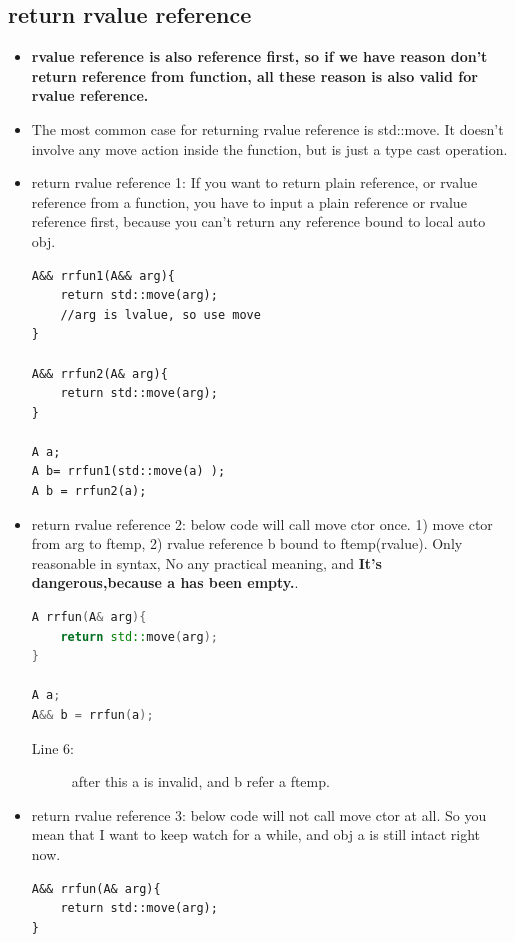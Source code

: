 \documentclass[a4paper,11pt,twoside]{book}
\begin{document}
\subsection{return rvalue reference}
\begin{itemize}
	\item \textbf{rvalue reference is also reference first, so if we have reason don't return reference from function, all these reason is also valid for rvalue reference.}
	
	\item The most common case for returning rvalue reference is std::move. It doesn't involve any move action inside the function, but is just a type cast operation.
	
	\item return rvalue reference 1:   If you want to return plain reference, or rvalue reference from a function, you have to input a plain reference or rvalue reference first, because you can't return any reference bound to local auto obj.
	
\begin{lstlisting}[numbers=none]
A&& rrfun1(A&& arg){
	return std::move(arg);
	//arg is lvalue, so use move
}
	
A&& rrfun2(A& arg){
	return std::move(arg);
}
	
A a;
A b= rrfun1(std::move(a) );
A b = rrfun2(a);
\end{lstlisting}
	
	
	\item return rvalue reference 2:   below code will call move ctor once.  1) move ctor from arg to ftemp, 2) rvalue reference b bound to ftemp(rvalue). Only reasonable in syntax, No any practical meaning, and \textbf{It's dangerous,because a has been empty.}.
\begin{lstlisting}[frame=single, language=c++]
A rrfun(A& arg){
	return std::move(arg);
}
	
A a;
A&& b = rrfun(a);
\end{lstlisting}
\begin{description}
	\item[Line 6:] after this a is invalid, and b refer a ftemp.
\end{description}
	

	\item return rvalue reference 3:   below code will not call move ctor at all. So you mean that I want to keep watch for a while, and obj a is still intact right now.
\begin{lstlisting}[numbers=none]
A&& rrfun(A& arg){
	return std::move(arg);
}
	

\end{lstlisting}
\end{itemize}
\end{document}
